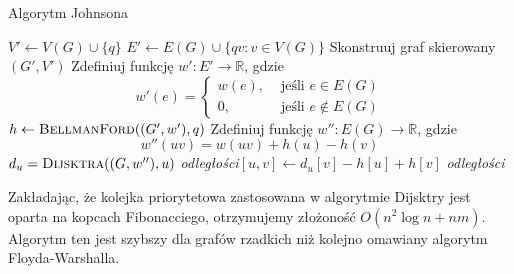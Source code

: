 \begin{algorithm}[H]
	\caption{Algorytm Johnsona}
	\begin{algorithmic}[1]
		\State $V' \gets V(G) \cup \{q\}$ 
		\State $E' \gets  E(G) \cup \{qv : v \in V(G)\}$
		\State Skonstruuj graf skierowany $(G', V')$
		\State Zdefiniuj funkcję $w' : E' \to \mathbb{R}$, 
		gdzie 
		\[w'(e) = \begin{cases}
			w(e), &\text{ jeśli } e \in E(G) \\
			0, &\text{ jeśli }  e \not \in E(G)   
		\end{cases}\]
		\State $h \gets \textsc{BellmanFord}((G', w'), q)$
		\State Zdefiniuj funkcję $w'' : E(G) \to \mathbb{R}$, 
		gdzie 
		\[w''(uv) = w(uv) + h(u) - h(v)\]
		\State $d_u = \textsc{Dijsktra}((G, w''), u)$
		\State \textit{odległości}$[u, v] \gets d_u[v] - h[u] + h[v]$
		\EndFor
		\EndFor
		\State \Return \textit{odległości}
		\EndProcedure
	\end{algorithmic}
	\label{Johnson}
\end{algorithm}

Zakładając, że kolejka priorytetowa zastosowana 
w algorytmie Dijsktry jest oparta na kopcach 
Fibonacciego, otrzymujemy złożoność $O(n^2\log n + nm)$. Algorytm 
ten jest szybszy dla grafów rzadkich niż kolejno omawiany 
algorytm Floyda-Warshalla. 

